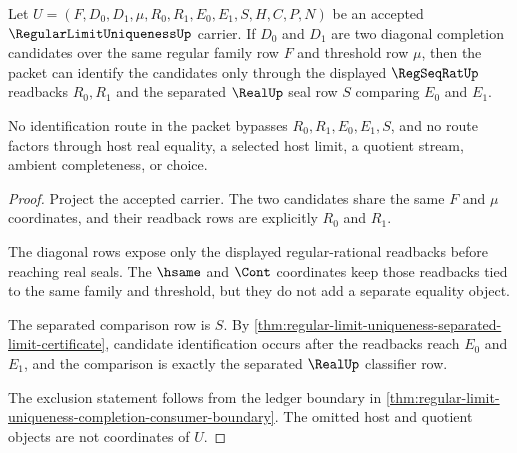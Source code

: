\begin{theorem}
\label{thm:regular-limit-uniqueness-readback-seal-exactness}
Let $U=(F,D_0,D_1,\mu,R_0,R_1,E_0,E_1,S,H,C,P,N)$ be an accepted $\RegularLimitUniquenessUp$ carrier. If $D_0$ and $D_1$ are two diagonal completion candidates over the same regular family row $F$ and threshold row $\mu$, then the packet can identify the candidates only through the displayed $\RegSeqRatUp$ readbacks $R_0,R_1$ and the separated $\RealUp$ seal row $S$ comparing $E_0$ and $E_1$.

No identification route in the packet bypasses $R_0,R_1,E_0,E_1,S$, and no route factors through host real equality, a selected host limit, a quotient stream, ambient completeness, or choice.
\end{theorem}
\begin{proof}
Project the accepted carrier. The two candidates share the same $F$ and $\mu$ coordinates, and their readback rows are explicitly $R_0$ and $R_1$.

The diagonal rows expose only the displayed regular-rational readbacks before reaching real seals. The $\hsame$ and $\Cont$ coordinates keep those readbacks tied to the same family and threshold, but they do not add a separate equality object.

The separated comparison row is $S$. By \autoref{thm:regular-limit-uniqueness-separated-limit-certificate}, candidate identification occurs after the readbacks reach $E_0$ and $E_1$, and the comparison is exactly the separated $\RealUp$ classifier row.

The exclusion statement follows from the ledger boundary in \autoref{thm:regular-limit-uniqueness-completion-consumer-boundary}. The omitted host and quotient objects are not coordinates of $U$.
\end{proof}


